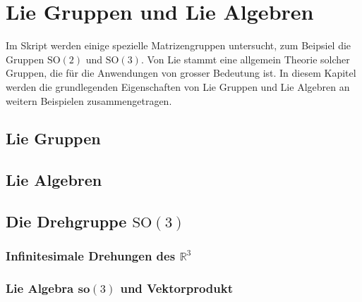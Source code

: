 %
%
%
\chapter{Lie Gruppen und Lie Algebren}
\rhead{}
Im Skript werden einige spezielle Matrizengruppen untersucht,
zum Beipsiel die Gruppen $\textrm{SO}(2)$ und $\textrm{SO}(3)$.
Von Lie stammt eine allgemein Theorie solcher Gruppen, die für die
Anwendungen von grosser Bedeutung ist.
In diesem Kapitel werden die grundlegenden Eigenschaften von 
Lie Gruppen und Lie Algebren an weitern Beispielen zusammengetragen.

\section{Lie Gruppen}

\section{Lie Algebren}

\section{Die Drehgruppe $\textrm{SO}(3)$}

\subsection{Infinitesimale Drehungen des $\mathbb R^3$}

\subsection{Lie Algebra $\textbf{so}(3)$ und Vektorprodukt}

